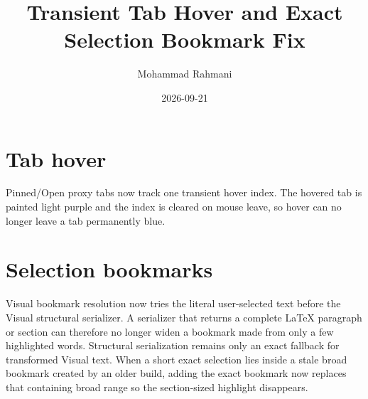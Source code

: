 \documentclass[a4paper]{article}
\title{Transient Tab Hover and Exact Selection Bookmark Fix}
\date{2026-09-21}
\author{Mohammad Rahmani}
\begin{document}
\maketitle
\begin{preview}
\section{Tab hover}
Pinned/Open proxy tabs now track one transient hover index.  The hovered tab is
painted light purple and the index is cleared on mouse leave, so hover can no
longer leave a tab permanently blue.
\section{Selection bookmarks}
Visual bookmark resolution now tries the literal user-selected text before the
Visual structural serializer.  A serializer that returns a complete LaTeX
paragraph or section can therefore no longer widen a bookmark made from only a
few highlighted words.  Structural serialization remains only an exact
fallback for transformed Visual text.  When a short exact selection lies inside
a stale broad bookmark created by an older build, adding the exact bookmark now
replaces that containing broad range so the section-sized highlight disappears.
\end{preview}


\end{document}
